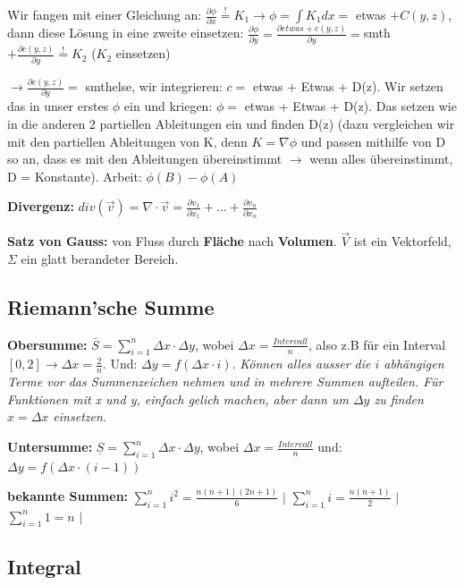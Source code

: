 \documentclass[a3paper, ngerman, 8pt]{article}
\newcommand{\mbeq}{\overset{!}{=}}
\begin{document}
\begin{multicols*}{3}
Wir fangen mit einer Gleichung an: $\frac{\partial\phi}{\partial x}\mbeq K_1 \to \phi = \int K_1 dx = $ etwas $+C(y,z)$, dann diese Lösung in eine zweite einsetzen: $\frac{\partial\phi}{\partial y}=\frac{\partial etwas + c(y,z)}{\partial y}= $smth$ + \frac{\partial c(y,z)}{\partial y} \mbeq K_2 $ ($K_2$ einsetzen)

$\to \frac{\partial c(y,z)}{\partial y} =$ smthelse, wir integrieren: $c=$ etwas + Etwas + D(z). Wir setzen das in unser erstes $\phi$ ein und kriegen: $\phi =$ etwas + Etwas + D(z). Das setzen wie in die anderen 2 partiellen Ableitungen ein und finden D(z) (dazu vergleichen wir mit den partiellen Ableitungen von K, denn $K=\nabla \phi$ und passen mithilfe von D so an, dass es mit den Ableitungen übereinstimmt $\to$ wenn alles übereinstimmt, D = Konstante). Arbeit: $\phi (B)-\phi(A)$


\textbf{Divergenz:} $div(\vec{v})=\nabla \cdot \vec{v}=\frac{\partial v_1}{\partial x_1}+...+\frac{\partial v_n}{\partial x_n}$

\textbf{Satz von Gauss:}  von Fluss durch \textbf{Fläche} nach \textbf{Volumen}. $\vec{V}$ ist ein Vektorfeld, $\Sigma$ ein glatt berandeter Bereich.

\subsection*{Riemann'sche Summe}
\textbf{Obersumme:} $\bar{S}=\sum_{i=1}^{n} \Delta x \cdot \Delta y$, wobei $\Delta x = \frac{Intervall}{n}$, also z.B für ein Interval $[0,2] \to \Delta x = \frac{2}{n}$. Und: $\Delta y = f(\Delta x \cdot i)$.
\textit{Können alles ausser die $i$ abhängigen Terme vor das Summenzeichen nehmen und in mehrere Summen aufteilen. Für Funktionen mit x und y, einfach gelich machen, aber dann um $\Delta y$ zu finden $x=\Delta x$ einsetzen.}

\textbf{Untersumme:} $\underline{S}=\sum_{i=1}^{n} \Delta x \cdot \Delta y$, wobei $\Delta x = \frac{Intervall}{n}$ und: $\Delta y = f(\Delta x \cdot (i-1))$


\textbf{bekannte Summen:} $\sum_{i=1}^{n} i^2 = \frac{n(n+1)(2n+1)}{6}$ $\big \vert$ $\sum_{i=1}^{n} i = \frac{n(n+1)}{2}$  $\big \vert$ $\sum_{i=1}^{n} 1=n$ $\big \vert$ 

\subsection*{Integral}


\end{multicols*}
\end{document}
